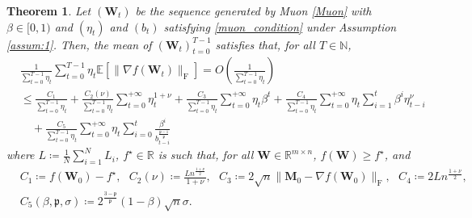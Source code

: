\documentclass[twoside,11pt]{article}
\newtheorem{thm}{Theorem}[section]
\begin{document}
\begin{thm}\label{thm:muon_convergence_rate_upper}
Let $(\bm{W}_t)$ be the sequence generated by Muon \eqref{Muon} with $\beta \in [0,1)$ and $(\eta_t)$ and $(b_t)$ satisfying \eqref{muon_condition} under Assumption \ref{assum:1}. Then, the mean of $(\bm{W}_t)_{t = 0}^{T -1}$ satisfies that, for all $T \in \mathbb{N}$,
\begin{align*}
&\frac{1}{\sum_{t= 0}^{T-1} \eta_t}
\sum_{t= 0}^{T -1} \eta_t 
\mathbb{E} [\| \nabla f (\bm{W}_t)\|_{\mathrm{F}}]
= O \left( \frac{1}{\sum_{t= 0}^{T -1} \eta_t} \right) \\
&\leq
\frac{C_1}{\sum_{t= 0}^{T-1} \eta_t}
+ \frac{C_2 (\nu)}{\sum_{t=0}^{T-1} \eta_t} \sum_{t=0}^{+ \infty} \eta_t^{1 + \nu}
+ \frac{C_3}{\sum_{t=0}^{T-1} \eta_t} \sum_{t=0}^{+ \infty} \eta_t \beta^t
+ \frac{C_4}{\sum_{t=0}^{T-1} \eta_t} \sum_{t=0}^{+ \infty} \eta_t \sum_{i=1}^t \beta^i \eta_{t-i}^\nu \\
&\quad + \frac{C_5}{\sum_{t=0}^{T-1} \eta_t} \sum_{t=0}^{+ \infty} \eta_t \sum_{i=0}^t 
\frac{\beta^i}{b_{t-i}^{\frac{\mathfrak{p} -1}{\mathfrak{p}}}}
\end{align*}
where $L \coloneqq \frac{1}{N} \sum_{i=1}^N L_i$, $f^\star \in \mathbb{R}$ is such that, for all $\bm{W} \in \mathbb{R}^{m \times n}$, $f(\bm{W}) \geq f^\star$, and 
\begin{align*}
&C_1 \coloneqq f(\bm{W}_{0}) - f^{\star}, \text{ }
C_2 (\nu) \coloneqq \frac{L n^{\frac{1 + \nu}{2}} }{1 + \nu}, \text{ } 
C_3 \coloneqq 2 \sqrt{n} \| \bm{M}_{0} - \nabla f(\bm{W}_{0}) \|_{\mathrm{F}}, \text{ }
C_4 \coloneqq 2 L n^{\frac{1+\nu}{2}},\\
&C_5 (\beta, \mathfrak{p}, \sigma) \coloneqq 2^{\frac{3 - \mathfrak{p}}{\mathfrak{p}}} (1 - \beta) \sqrt{n} \sigma.
\end{align*}
\end{thm}
\end{document}
